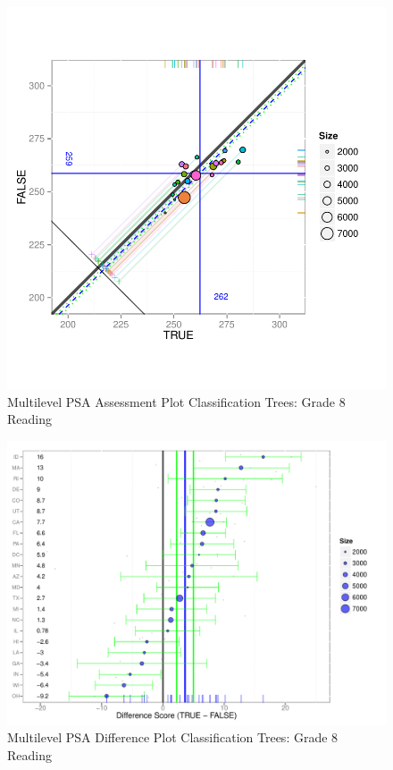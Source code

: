 \begin{figure}[h!]
\begin{center}
\includegraphics[width=\textwidth]{../Figures2009/g8read-mlpsa-ctree-circ.pdf}
\caption{Multilevel PSA Assessment Plot Classification Trees: Grade 8 Reading}
\end{center}
\end{figure}

\begin{figure}[h!]
\begin{center}
\includegraphics[width=\textwidth]{../Figures2009/g8read-mlpsa-ctree-diff.pdf}
\caption{Multilevel PSA Difference Plot Classification Trees: Grade 8 Reading}
\end{center}
\end{figure}


